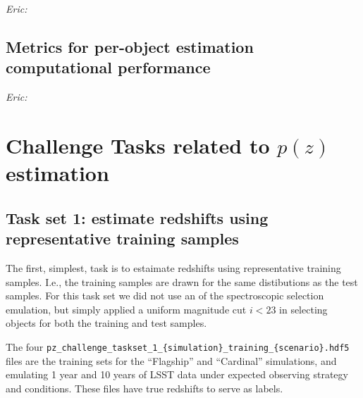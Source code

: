 \documentclass[modern]{desc-tex/styles/lsstdescnote}
\newcommand{\eac}[1]{{\em Eric:  }{\color{red}{#1}}}
\begin{document}
\eac{PIT-QQ related metrics}


\subsection{Metrics for per-object estimation computational performance}

\eac{Training time, per-object estimation time, model size, estimate data volume per-object}












\section{Challenge Tasks related to $p(z)$ estimation}\label{sec:tasks}

\subsection{Task set 1:  estimate redshifts using representative
  training samples}

The first, simplest, task is to estaimate redshifts using
representative training samples.  I.e., the training samples are drawn
for the same distibutions as the test samples.  For this task set we
did not use an of the spectroscopic selection emulation, but simply
applied a uniform magnitude cut $i < 23$ in selecting objects for both
the training and test samples.

The four 
\texttt{pz\_challenge\_taskset\_1\_\{simulation\}\_training\_\{scenario\}.hdf5}
files are the training sets for the ``Flagship'' and ``Cardinal''
simulations, and emulating 1 year and 10 years of LSST data under
expected observing strategy and conditions.  These files have true
redshifts to serve as labels.
\end{document}
